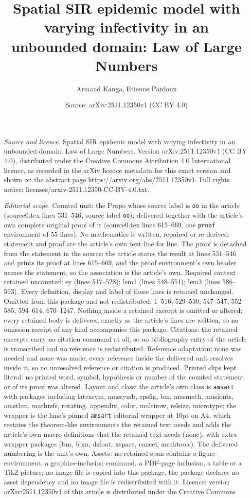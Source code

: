\documentclass[10pt,a4paper]{amsart}
\title[Spatial SIR epidemic model with varying infectivity in an un]{Spatial SIR epidemic model with varying infectivity in an unbounded domain: Law of Large Numbers}
\author{Armand Kanga, Etienne Pardoux}
\date{Source: arXiv:2511.12350v1 (CC BY 4.0)}
\begin{document}
\maketitle

\noindent\emph{Source and licence.} Spatial SIR epidemic model with varying infectivity in an unbounded domain: Law of Large Numbers. Version arXiv:2511.12350v1 (CC BY 4.0), distributed under the Creative Commons Attribution 4.0 International licence, as recorded in the arXiv licence metadata for this exact version and shown on the abstract page https://arxiv.org/abs/2511.12350v1. Full rights notice: licenses/arxiv-2511.12350-CC-BY-4.0.txt.\par\smallskip

\noindent\textit{Editorial scope.} Counted unit: the Propo whose source label is \texttt{oo} in the article (source0.tex lines 531--546, source label \texttt{oo}), delivered together with the article's own complete original proof of it (source0.tex lines 615--669, one \texttt{proof} environment of 55 lines). No mathematics is written, repaired or re-derived: statement and proof are the article's own text line for line. The proof is detached from the statement in the source: the article states the result at lines 531--546 and prints its proof at lines 615--669, and the proof environment's own header names the statement, so the association is the article's own. Required context retained uncounted: sy (lines 517--528); lem1 (lines 548--551); lem3 (lines 586--593). Every definition, display and label of those lines is retained unchanged. Omitted from this package and not redistributed: 1--516, 529--530, 547--547, 552--585, 594--614, 670--1247. Nothing inside a retained excerpt is omitted or altered: every retained body is delivered exactly as the article's lines are written, so no omission receipt of any kind accompanies this package. Citations: the retained excerpts carry no citation command at all, so no bibliography entry of the article is transcribed and no reference is redistributed. Reference adaptation: none was needed and none was made; every reference inside the delivered unit resolves inside it, so no unresolved reference or citation is produced. Printed slips kept literal: no printed word, symbol, hypothesis or number of the counted statement or of its proof was altered. Layout and class: the article's own class is \texttt{amsart} with packages including latexsym, amssymb, epsfig, bm, amsmath, amsfonts, amsthm, mathrsfs, rotating, appendix, color, multirow, relsize, microtype; the wrapper is the lane's pinned \texttt{amsart} editorial wrapper at 10pt on A4, which restates the theorem-like environments the retained text needs and adds the article's own macro definitions that the retained text needs (none), with extra wrapper packages (bm, bbm, dsfont, xspace, cancel, mathtools). The delivered numbering is the unit's own. Assets: no retained span contains a figure environment, a graphics-inclusion command, a PDF-page inclusion, a table or a TikZ picture; no image file is copied into this package, the package declares no asset dependency and no image file is redistributed with it. Licence: version arXiv:2511.12350v1 of this article is distributed under the Creative Commons 
\end{document}
